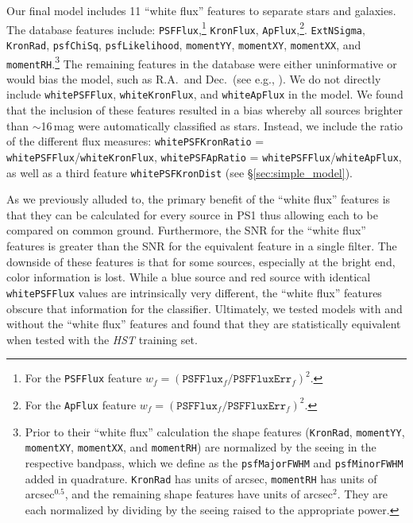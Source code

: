 \documentclass[twocolumn, dvipdfmx]{aastex62}
\begin{document}
Our final model includes 11 ``white flux'' features to separate stars and
galaxies. The database features include: \texttt{PSFFlux},\footnote{For the
\texttt{PSFFlux} feature $w_f =
(\mathtt{PSFFlux}_f/\mathtt{PSFFluxErr}_f)^2$.} \texttt{KronFlux},
\texttt{ApFlux},\footnote{For the \texttt{ApFlux} feature $w_f =
(\mathtt{PSFFlux}_f/\mathtt{PSFFluxErr}_f)^2$.}. 
\texttt{ExtNSigma},
\texttt{KronRad}, \texttt{psfChiSq}, \texttt{psfLikelihood},
\texttt{momentYY}, \texttt{momentXY}, \texttt{momentXX}, and
\texttt{momentRH}.\footnote{Prior to their ``white flux'' calculation the
shape features (\texttt{KronRad}, \texttt{momentYY}, \texttt{momentXY},
\texttt{momentXX}, and \texttt{momentRH}) are normalized by the seeing in the
respective bandpass, which we define as the \texttt{psfMajorFWHM} and
\texttt{psfMinorFWHM} added in quadrature. \texttt{KronRad} has units of
arcsec, \texttt{momentRH} has units of arcsec$^{0.5}$, and the remaining
shape features have units of arcsec$^{2}$. They are each normalized by
dividing by the seeing raised to the appropriate power. } The remaining
features in the database were either uninformative or would bias the model,
such as R.A.\ and Dec.\ (see e.g., \citealt{Richards12a}). We do not directly
include \texttt{whitePSFFlux}, \texttt{whiteKronFlux}, and
\texttt{whiteApFlux} in the model. We found that the inclusion of these
features resulted in a bias whereby all sources brighter than $\sim$16\,mag
were automatically classified as stars. Instead, we include the ratio of the
different flux measures: \texttt{whitePSFKronRatio} =
\texttt{whitePSFFlux}/\texttt{whiteKronFlux}, \texttt{whitePSFApRatio} =
\texttt{whitePSFFlux}/\texttt{whiteApFlux}, as well as a third feature
\texttt{whitePSFKronDist} (see \S\ref{sec:simple_model}).

As we previously alluded to, the primary benefit of the ``white flux''
features is that they can be calculated for every source in PS1 thus allowing
each to be compared on common ground. Furthermore, the SNR for the ``white
flux'' features is greater than the SNR for the equivalent feature in a
single filter. The downside of these features is that for some sources,
especially at the bright end, color information is lost. While a blue source
and red source with identical \texttt{whitePSFFlux} values are intrinsically
very different, the ``white flux'' features obscure that information for the
classifier. Ultimately, we tested models with and without the ``white flux''
features and found that they are statistically equivalent when tested with
the \textit{HST} training set.
\end{document}
